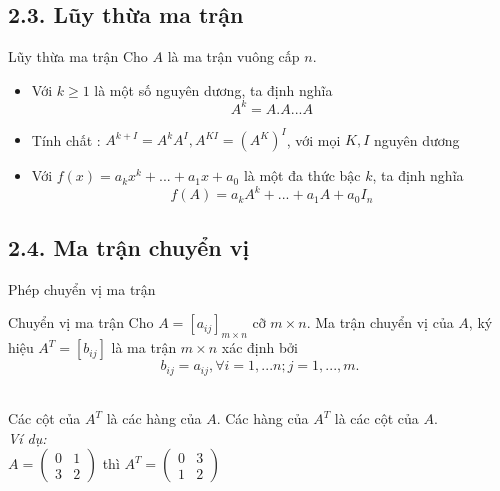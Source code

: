 \documentclass[pdf,10pt]{beamer}
\begin{document}
\subsection{2.3. Lũy thừa ma trận}
\begin{frame}{Lũy thừa ma trận}
	Cho $A$ là ma trận vuông cấp $n$.
	\begin{itemize}
		\item Với $k \ge 1$ là một số nguyên dương, ta định nghĩa
		\begin{displaymath}
			A^{k}=A.A...A
		\end{displaymath}
		\item Tính chất : $A^{k+I} = A^k A^I, A^{KI} = (A^K)^I$, với mọi $K,I$ nguyên dương \\
		\item Với $f(x) = a_k x^k + ... + a_1 x + a_0$ là một đa thức bậc $k$, ta định nghĩa
		\[f(A)=a_k A^k + ... + a_1 A + a_0 I_n\]
	\end{itemize}
\end{frame}

\subsection{2.4. Ma trận chuyển vị}
\begin{frame}{Phép chuyển vị ma trận}
	\begin{block}{Chuyển vị ma trận}
		Cho $A = [a_{ij}]_{m\times n} $ cỡ $m \times n $. Ma trận chuyển vị của $A$, ký hiệu $A^T = [b_{ij}]$ là
		ma trận $m \times n $ xác định bởi
		\begin{displaymath}
			b_{ij} = a_{ij}, \forall i = 1,...n;j=1,...,m.\end{displaymath}
	\end{block}\ \\
	Các cột của $A^T$ là các hàng của $A$. Các hàng của $A^T$ là các cột của $A$.\\[2mm]
	\textit{Ví dụ:}\\
	\centering
	{
	\begin{math}
		A = \left(
		\begin{array}{cc}
			0 & 1 \\
			3 & 2
		\end{array}
		\right )
	\end{math} thì
	\begin{math}
		A ^T = \left(
		\begin{array}{cc}
			0 & 3 \\
			1 & 2
		\end{array}
		\right)
	\end{math}
	}
\end{frame}
\end{document}
